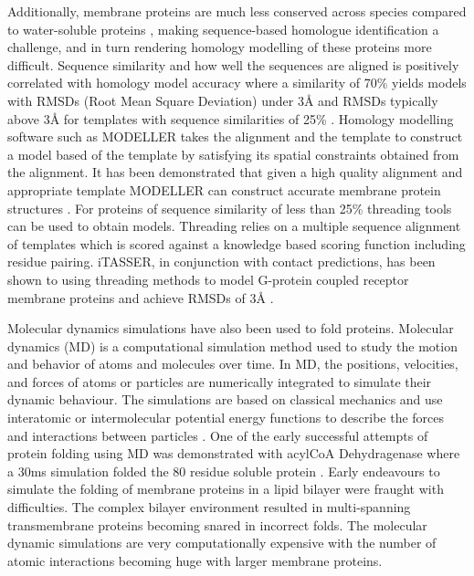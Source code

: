 Additionally, membrane proteins are much less conserved across species compared to water-soluble proteins \cite{Sojo2016}, making sequence-based homologue identification a challenge, and in turn rendering homology modelling of these proteins more difficult. Sequence similarity and how well the sequences are aligned is positively correlated with homology model accuracy where a similarity of 70\% yields models with RMSDs (Root Mean Square Deviation) under 3{\AA} and RMSDs typically above 3{\AA} for templates with sequence similarities of 25\% \cite{baker2001protein}.  Homology modelling software such as MODELLER \cite{webb2016comparative} takes the alignment and the template to construct a model based of the template by satisfying its spatial constraints obtained from the alignment.  It has been demonstrated that given a high quality alignment and appropriate template MODELLER can construct accurate membrane protein structures \cite{tabassum2014structural}.  For proteins of sequence similarity of less than 25\% threading tools can be used to obtain models.  Threading relies on a multiple sequence alignment of templates which is scored against a knowledge based scoring function including residue pairing.  iTASSER, in conjunction with contact predictions, has been shown to using threading methods to model G-protein coupled receptor membrane proteins and achieve RMSDs of 3{\AA} \cite{yang2015tasser}. 

Molecular dynamics simulations have also been used to fold proteins.  Molecular dynamics (MD) is a computational simulation method used to study the motion and behavior of atoms and molecules over time. 
In MD, the positions, velocities, and forces of atoms or particles are numerically integrated to simulate their dynamic behaviour. The simulations are based on classical mechanics and use interatomic or intermolecular potential energy functions to describe the forces and interactions between particles \cite{hansson2002molecular}.  One of the early successful attempts of protein folding using MD was demonstrated with acylCoA Dehydragenase where a 30ms simulation folded the 80 residue soluble protein \cite{lane2013milliseconds,bonito2016insights}.  Early endeavours to simulate the folding of membrane proteins in a lipid bilayer were fraught with difficulties.  The complex bilayer environment resulted in multi-spanning transmembrane proteins becoming snared in incorrect folds.  The molecular dynamic simulations are very computationally expensive with the number of atomic interactions becoming huge with larger membrane proteins.

